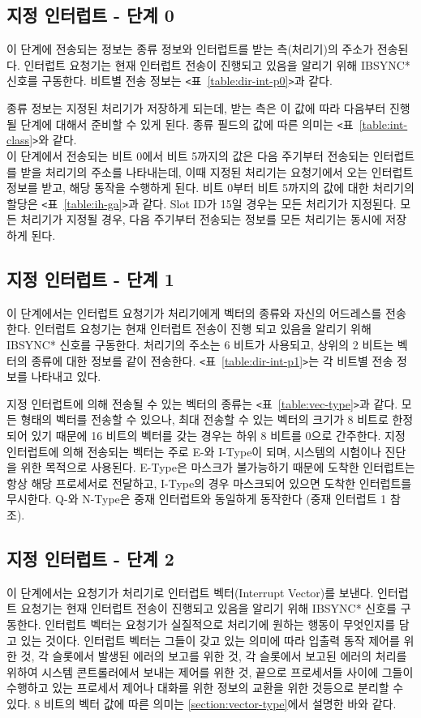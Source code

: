 \subsection*{지정 인터럽트 - 단계 0}
이 단계에 전송되는 정보는 종류 정보와 인터럽트를 받는 측(처리기)의 주소가 전송된다.
인터럽트 요청기는 현재 인터럽트 전송이 진행되고 있음을 알리기 위해 IBSYNC* 신호를 구동한다.
비트별 전송 정보는 {\tt <}표~\ref{table:dir-int-p0}{\tt >}과 같다.

종류 정보는 지정된 처리기가 저장하게 되는데, 받는 측은 이 값에 따라
다음부터 진행될 단계에 대해서 준비할 수 있게 된다.
종류 필드의 값에 따른 의미는 {\tt <}표~\ref{table:int-class}{\tt >}와 같다. \\
이 단계에서 전송되는 비트 0에서 비트 5까지의 값은 다음 주기부터 전송되는 인터럽트를
받을 처리기의 주소를 나타내는데, 이때 지정된 처리기는 요청기에서 오는 인터럽트 정보를
받고, 해당 동작을 수행하게 된다.
비트 0부터 비트 5까지의 값에 대한 처리기의 할당은 {\tt <}표~\ref{table:ih-ga}{\tt >}과 같다.
Slot ID가 15일 경우는 모든 처리기가 지정된다.
모든 처리기가 지정될 경우, 다음 주기부터 전송되는 정보를 모든 처리기는 동시에 저장하게 된다.

%
\subsection*{지정 인터럽트 - 단계 1}
이 단계에서는 인터럽트 요청기가 처리기에게 벡터의 종류와 자신의 어드레스를 전송한다.
인터럽트 요청기는 현재 인터럽트 전송이 진행 되고 있음을 알리기 위해 IBSYNC* 신호를 구동한다.
처리기의 주소는 6 비트가 사용되고, 상위의 2 비트는 벡터의 종류에 대한 정보를 같이 전송한다.
{\tt <}표~\ref{table:dir-int-p1}{\tt >}는 각 비트별 전송 정보를
나타내고 있다.

지정 인터럽트에 의해 전송될 수 있는 벡터의 종류는
{\tt <}표~\ref{table:vec-type}{\tt >}과 같다.
모든 형태의 벡터를 전송할 수 있으나, 최대 전송할 수 있는 벡터의 크기가 8 비트로
한정되어 있기 때문에 16 비트의 벡터를 갖는 경우는 하위 8 비트를 0으로 간주한다.
지정 인터럽트에 의해 전송되는 벡터는 주로 E-와 I-Type이 되며,
시스템의 시험이나 진단을 위한 목적으로 사용된다.
E-Type은 마스크가 불가능하기 때문에 도착한 인터럽트는 항상 해당 프로세서로 전달하고,
I-Type의 경우 마스크되어 있으면 도착한 인터럽트를 무시한다.
Q-와 N-Type은 중재 인터럽트와 동일하게 동작한다 (중재 인터럽트 1 참조).
%
\subsection*{지정 인터럽트 - 단계 2}
이 단계에서는 요청기가 처리기로 인터럽트 벡터(Interrupt Vector)를 보낸다.
인터럽트 요청기는 현재 인터럽트 전송이 진행되고 있음을 알리기 위해 IBSYNC* 신호를 구동한다.
인터럽트 벡터는 요청기가 실질적으로 처리기에 원하는 행동이 무엇인지를 담고 있는 것이다.
인터럽트 벡터는 그들이 갖고 있는 의미에 따라 입출력 동작 제어를 위한 것,
각 슬롯에서 발생된 에러의 보고를 위한 것,
각 슬롯에서 보고된 에러의 처리를 위하여 시스템 콘트롤러에서 보내는 제어를 위한 것,
끝으로 프로세서들 사이에 그들이 수행하고 있는 프로세서 제어나 대화를 위한 정보의
교환을 위한 것등으로 분리할 수 있다.
8 비트의 벡터 값에 따른 의미는 \ref{section:vector-type}에서 설명한 바와 같다.
%
